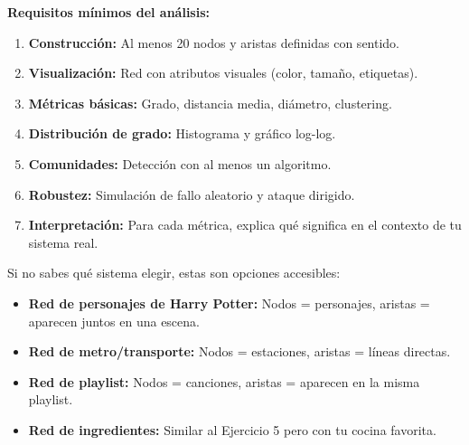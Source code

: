 \documentclass[
  letterpaper,
  DIV=11,
  numbers=noendperiod]{scrreprt}
\providecommand{\tightlist}{%
  \setlength{\itemsep}{0pt}\setlength{\parskip}{0pt}}
\begin{document}
\textbf{Requisitos mínimos del análisis:}

\begin{enumerate}
\def\labelenumi{\arabic{enumi}.}
\tightlist
\item
  \textbf{Construcción:} Al menos 20 nodos y aristas definidas con
  sentido.
\item
  \textbf{Visualización:} Red con atributos visuales (color, tamaño,
  etiquetas).
\item
  \textbf{Métricas básicas:} Grado, distancia media, diámetro,
  clustering.
\item
  \textbf{Distribución de grado:} Histograma y gráfico log-log.
\item
  \textbf{Comunidades:} Detección con al menos un algoritmo.
\item
  \textbf{Robustez:} Simulación de fallo aleatorio y ataque dirigido.
\item
  \textbf{Interpretación:} Para cada métrica, explica qué significa en
  el contexto de tu sistema real.
\end{enumerate}

\begin{tcolorbox}[enhanced jigsaw, toprule=.15mm, colframe=quarto-callout-note-color-frame, coltitle=black, titlerule=0mm, colback=white, breakable, leftrule=.75mm, arc=.35mm, bottomtitle=1mm, toptitle=1mm, rightrule=.15mm, bottomrule=.15mm, left=2mm, title=\textcolor{quarto-callout-note-color}{\faInfo}\hspace{0.5em}{💡 Pista 1}, colbacktitle=quarto-callout-note-color!10!white, opacityback=0, opacitybacktitle=0.6]

Si no sabes qué sistema elegir, estas son opciones accesibles:

\begin{itemize}
\tightlist
\item
  \textbf{Red de personajes de Harry Potter:} Nodos = personajes,
  aristas = aparecen juntos en una escena.
\item
  \textbf{Red de metro/transporte:} Nodos = estaciones, aristas = líneas
  directas.
\item
  \textbf{Red de playlist:} Nodos = canciones, aristas = aparecen en la
  misma playlist.
\item
  \textbf{Red de ingredientes:} Similar al Ejercicio 5 pero con tu
  cocina favorita.
\end{itemize}

\end{tcolorbox}
\end{document}

